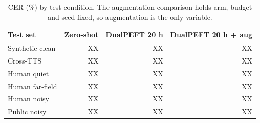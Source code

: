 \begin{table}[t]
\centering
\caption{CER (\%) by test condition. The augmentation comparison holds arm, budget and seed fixed, so augmentation is the only variable.}
\label{tab:table3_robustness}
\begin{tabular}{lrrr}
\toprule
Test set & Zero-shot & DualPEFT 20 h & DualPEFT 20 h + aug \\
\midrule
Synthetic clean & XX & XX & XX \\
Cross-TTS & XX & XX & XX \\
Human quiet & XX & XX & XX \\
Human far-field & XX & XX & XX \\
Human noisy & XX & XX & XX \\
Public noisy & XX & XX & XX \\
\bottomrule
\end{tabular}
\end{table}
